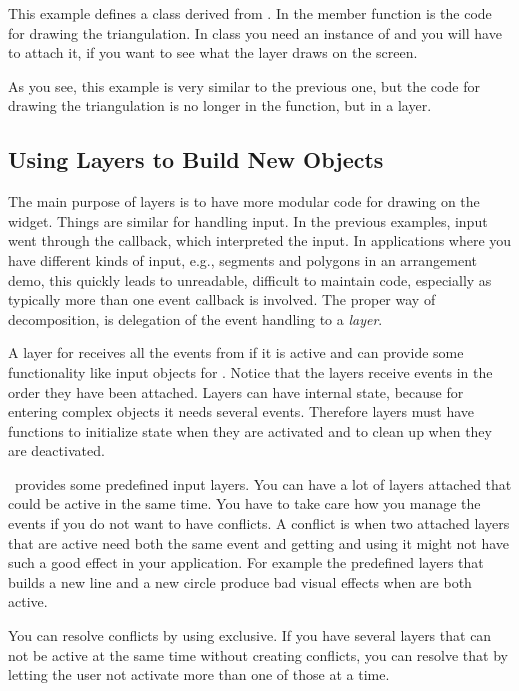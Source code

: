 This example defines a class derived from
. In the member function 
is the code for drawing the triangulation. In 
class you need an instance of  and you will 
have to attach it, if you want to see what the layer draws on the
screen.

As you see, this example is very similar to the previous one, but
the code for drawing the triangulation is no longer in the
 function, but in a layer.



\subsection{Using Layers to Build New Objects }
\label{Qt_widget_tools}

The main purpose of layers is to have more modular code for drawing on
the widget. Things are similar for handling input. In the previous
examples, input went through the 
callback, which interpreted the input. In applications where you have
different kinds of input, e.g., segments and polygons in an
arrangement demo, this quickly leads to unreadable, difficult to maintain
code,  especially as typically more than one event callback is
involved. The proper way of decomposition, is delegation
of the event handling to a {\em layer}. 

A layer for  receives all the events from
 if it is active and can provide some functionality
like input objects for . Notice that the layers
receive events in the order they have been attached. Layers can have
internal state, because for entering complex objects it needs several
events. Therefore layers must have functions to initialize state when
they are activated and to clean up when they are deactivated.

\cgal\ provides some predefined input layers. You can have a lot of
layers attached that could be active in the same time. You have to
take care how you manage the events if you do not want to have
conflicts. A conflict is when two attached layers that are active need 
both the same event and getting and using it might not have such a
good effect in your application. For example the predefined layers that 
builds a new line and a new circle produce bad visual effects when are 
both active.

You can resolve conflicts by using  exclusive. If you have 
several layers that can not be active at the same time without creating
conflicts, you can resolve that by letting the user not activate
more than one of those at a time.

